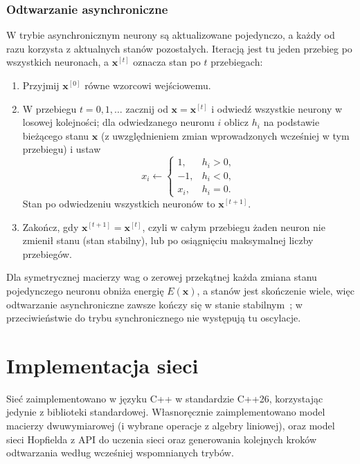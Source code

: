 \documentclass{article}
\begin{document}
\subsubsection{Odtwarzanie asynchroniczne}
\label{sec:async}
W trybie asynchronicznym neurony są aktualizowane pojedynczo, a każdy od razu korzysta z aktualnych stanów pozostałych.
Iteracją jest tu jeden przebieg po wszystkich neuronach, a $\mathbf{x}^{[t]}$ oznacza stan po $t$ przebiegach:
\begin{enumerate}
  \item Przyjmij $\mathbf{x}^{[0]}$ równe wzorcowi wejściowemu.
  \item W przebiegu $t = 0, 1, \ldots$ zacznij od $\mathbf{x} = \mathbf{x}^{[t]}$
        i odwiedź wszystkie neurony w losowej kolejności;
        dla odwiedzanego neuronu $i$ oblicz $h_i$ na podstawie bieżącego stanu $\mathbf{x}$
        (z uwzględnieniem zmian wprowadzonych wcześniej w tym przebiegu) i ustaw
        \[
          x_i \leftarrow
          \begin{cases}
            1,   & h_i > 0, \\
            -1,  & h_i < 0, \\
            x_i, & h_i = 0.
          \end{cases}
        \]
        Stan po odwiedzeniu wszystkich neuronów to $\mathbf{x}^{[t+1]}$.
  \item Zakończ, gdy $\mathbf{x}^{[t+1]} = \mathbf{x}^{[t]}$, czyli w całym przebiegu żaden neuron nie zmienił stanu (stan stabilny),
        lub po osiągnięciu maksymalnej liczby przebiegów.
\end{enumerate}
Dla symetrycznej macierzy wag o zerowej przekątnej każda zmiana stanu pojedynczego neuronu obniża energię $E(\mathbf{x})$,
a stanów jest skończenie wiele, więc odtwarzanie asynchroniczne zawsze kończy się w stanie stabilnym~\cite{hopfield1982};
w przeciwieństwie do trybu synchronicznego nie występują tu oscylacje.

\section{Implementacja sieci}
\label{sec:impl}
Sieć zaimplementowano w języku C++ w standardzie C++26, korzystając jedynie z biblioteki standardowej.
Własnoręcznie zaimplementowano model macierzy dwuwymiarowej (i wybrane operacje z algebry liniowej),
oraz model sieci Hopfielda z API do uczenia sieci oraz generowania kolejnych kroków odtwarzania według wcześniej wspomnianych trybów.
\end{document}

